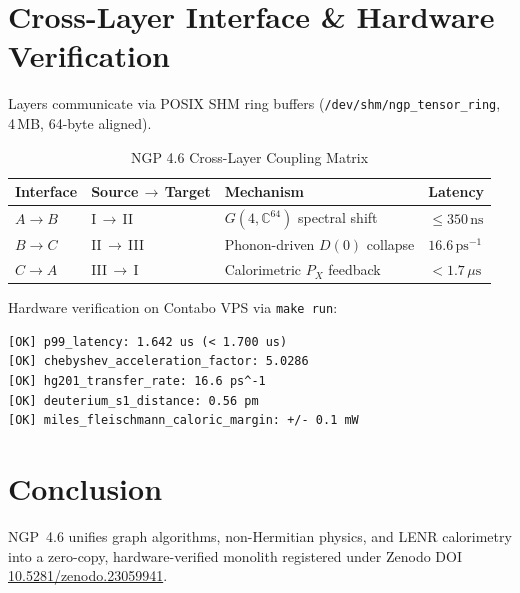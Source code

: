 \documentclass[10pt,twocolumn]{article}
\begin{document}
\section{Cross-Layer Interface \& Hardware Verification}
Layers communicate via POSIX SHM ring buffers
(\texttt{/dev/shm/ngp\_tensor\_ring}, 4\,MB, 64-byte aligned).

\begin{table}[h]
\centering
\caption{NGP 4.6 Cross-Layer Coupling Matrix}
\begin{tabular}{llll}
\toprule
\textbf{Interface} & \textbf{Source\,$\to$\,Target} & \textbf{Mechanism} & \textbf{Latency}\\
\midrule
$A\to B$ & I\,$\to$\,II   & $G(4,\mathbb{C}^{64})$ spectral shift & $\le350\,\mathrm{ns}$\\
$B\to C$ & II\,$\to$\,III & Phonon-driven $D(0)$ collapse         & $16.6\,\mathrm{ps}^{-1}$\\
$C\to A$ & III\,$\to$\,I  & Calorimetric $P_X$ feedback           & $<1.7\,\mu\mathrm{s}$\\
\bottomrule
\end{tabular}
\end{table}

Hardware verification on Contabo VPS via \texttt{make run}:
\begin{verbatim}
[OK] p99_latency: 1.642 us (< 1.700 us)
[OK] chebyshev_acceleration_factor: 5.0286
[OK] hg201_transfer_rate: 16.6 ps^-1
[OK] deuterium_s1_distance: 0.56 pm
[OK] miles_fleischmann_caloric_margin: +/- 0.1 mW
\end{verbatim}

\section{Conclusion}
NGP~4.6 unifies graph algorithms, non-Hermitian physics, and LENR calorimetry
into a zero-copy, hardware-verified monolith registered under Zenodo DOI
\href{https://doi.org/10.5281/zenodo.23059941}{10.5281/zenodo.23059941}.
\end{document}
